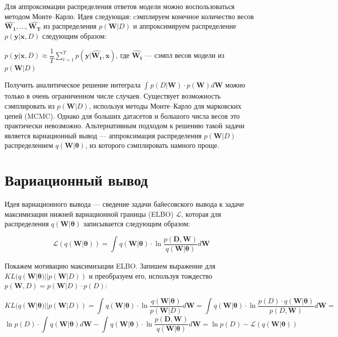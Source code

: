 \documentclass{article}
\begin{document}
Для аппроксимации распределения ответов модели можно воспользоваться методом Монте--Карло. Идея следующая: cэмплируем конечное количество весов $\hat{\mathbf{W_1}}, \dots, \hat{\mathbf{W_T}}$ из распределения $p(\mathbf{W}| D)$  и аппроксимируем распределение $p(\mathbf{y} | \mathbf{x}, D)$ следующим образом:

$
p(\mathbf{y} | \mathbf{x}, D)
\approx \dfrac{1}{T} \sum_{t=1}^{T}{p(\mathbf{y} | \hat{\mathbf{W_t}}, \mathbf{x})}
$, где $\hat{\mathbf{W_t}}$ --- сэмпл весов модели из $p(\mathbf{W}| D)$

Получить аналитическое решение интеграла $\int_{}{} p(D | \mathbf{W}) \cdot p(\mathbf{W}) d\mathbf{W}$ можно только в очень ограниченном числе случаев. Существует возможность сэмплировать из $p(\mathbf{W}| D)$, используя методы Монте--Карло для марковских цепей (MCMC). Однако для больших датасетов и большого числа весов это практически невозможно.
Альтернативным подходом к решению такой задачи является вариационный вывод --- аппроксимация распределения $p(\mathbf{W}| D)$ распределением $q(\mathbf{W} | \pmb{\theta})$, из которого сэмплировать намного проще.

\section{Вариационный вывод}
Идея вариационного вывода --- сведение задачи байесовского вывода к задаче максимизации нижней вариационной границы (ELBO) $\mathcal{L}$, которая для распределения $q(\mathbf{W} | \pmb{\theta})$ записывается следующим образом:

\[
\mathcal{L}(q(\mathbf{W} | \pmb{\theta})) =
\int_{}{} q(\mathbf{W} | \pmb{\theta}) \cdot \ln{\dfrac{p(\mathbf{D}, \mathbf{W})}{q(\mathbf{W} | \pmb{\theta})}} d\mathbf{W}
\]

Покажем мотивацию максимизации ELBO.
Запишем выражение для $KL(q(\mathbf{W} | \pmb{\theta}) || p(\mathbf{W}| D))$ и преобразуем его,
используя тождество $p(\mathbf{W}, D) = p(\mathbf{W}| D)\cdot p(D)$:

\[
KL(q(\mathbf{W} | \pmb{\theta}) || p(\mathbf{W}| D)) =
\int_{}{} q(\mathbf{W} | \pmb{\theta}) \cdot \ln{\dfrac{q(\mathbf{W} | \pmb{\theta})}{p(\mathbf{W}| D)}} d\mathbf{W} =
\int_{}{} q(\mathbf{W} | \pmb{\theta}) \cdot \ln{\dfrac{p(D) \cdot q(\mathbf{W} | \pmb{\theta})}{p(D, \mathbf{W})}} d\mathbf{W} =
\]\[
\ln{p(D)} \cdot \int_{}{} q(\mathbf{W} | \pmb{\theta}) d\mathbf{W} - \int_{}{} q(\mathbf{W} | \pmb{\theta}) \cdot \ln{\dfrac{p(\mathbf{D}, \mathbf{W})}{q(\mathbf{W} | \pmb{\theta})}} d\mathbf{W} =
\ln{p(D)} - \mathcal{L}(q(\mathbf{W} | \pmb{\theta}))
\]
\end{document}
